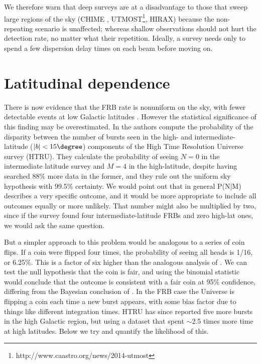 \documentclass[useAMS,usenatbib]{mn2e}
\begin{document}
We therefore warn that deep surveys are at a disadvantage 
to those that sweep large regions of the sky 
(CHIME  \citep{2014SPIE.9145E..22B}, 
UTMOST\footnote{http://www.caastro.org/news/2014-utmost}, HIRAX)
because the non-repeating 
scenario is unaffected; whereas shallow observations 
should not hurt the detection rate, no matter what their repetition. 
Ideally, a survey
needs only to spend a few dispersion delay times on each beam 
before moving on. 

\section{Latitudinal dependence}
\label{latitude}
There is now evidence that the FRB rate is nonuniform on the sky, 
with fewer detectable events at low Galactic latitudes \citep{2014ira..book.....B}.
However the statistical significance of this finding may be 
overestimated. In \citep{2014ApJ...789L..26P}
the authors compute the probability of the disparity between the number of 
bursts seen in the high- and intermediate-latitude ($|b| < 15\degree$)
components of the High Time Resolution Universe survey 
(HTRU). They calculate the probability of seeing $N=0$ in the intermediate 
latitude survey and $M=4$ in 
the high-latitude, despite having searched 88$\%$ more data in the former, and they 
rule out the uniform sky hypothesis with 99.5$\%$ certainty. We would point out 
that in general P(N$|$M) describes a very specific outcome, and it would be 
more appropriate to include all outcomes equally or more unlikely.
That number might also be multiplied by two, since if the survey found 
four intermediate-latitude FRBs and zero high-lat ones, we would ask the same 
question. 

But a simpler approach to this problem would be analogous to a series of 
coin flips. If a coin were flipped four times, the probability of seeing all heads is 1/16, 
or 6.25$\%$. This is a factor of six higher than  the analogous analysis of 
\citet{2014ApJ...789L..26P}.  We can test the null hypothesis that the coin is fair, and using
the binomial statistic would conclude that the outcome is consistent with a 
fair coin at 95\% confidence, differing from the Bayesian conclusion of \citet{2014ApJ...789L..26P}.
In the FRB case the Universe is flipping a coin each time a new burst 
appears, with some bias factor due to things like different integration times.
HTRU 
has since reported five more bursts in the high Galactic region, but using a dataset 
that spent $\sim$2.5 times more time at high latitudes. Below we try and quantify the likelihood of 
this.
\end{document}
